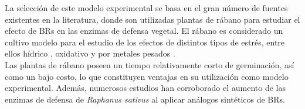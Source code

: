La selecci\'on de este modelo experimental se basa en el gran n\'umero de fuentes existentes en la literatura, donde son utilizadas plantas de r\'abano para estudiar el efecto de BRs en las enzimas de defensa vegetal. El r\'abano es considerado un cultivo modelo para el estudio de los efectos de distintos tipos de estr\'es, entre ellos h\'idrico  \citep{mahesh2013effect}, oxidativo \citep{sharma2012effect} y por metales pesados \citep{dhriti201424}. \\

Las plantas de r\'abano poseen un tiempo relativamente corto de germinaci\'on, as\'i como un bajo costo, lo que constituyen ventajas en su utilizaci\'on como modelo experimental. Adem\'as, numerosos estudios han corroborado el aumento de las enzimas de defensa de \textit{Raphanus sativus} al aplicar an\'alogos sint\'eticos de BRs. 

